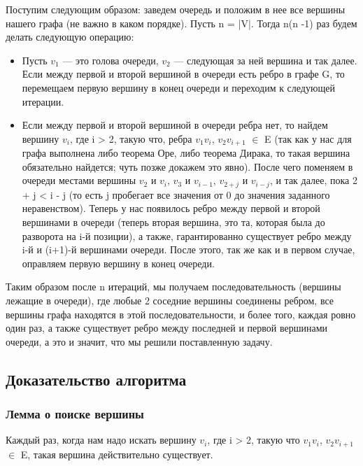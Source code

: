 Поступим следующим образом: заведем очередь и положим в нее все вершины нашего графа (не важно в каком порядке).
Пусть n = |V|. Тогда n(n -1) раз будем делать следующую операцию:
\begin{itemize}

    \item Пусть $v_1$ — это голова очереди, $v_2$ — следующая за ней вершина и так далее.
    Если между первой и второй вершиной в очереди есть ребро в графе G, то перемещаем первую вершину в конец очереди и переходим к следующей итерации.

    \item Если между первой и второй вершиной в очереди ребра нет, то найдем вершину $v_i$, где i > 2, такую что, ребра $v_1$$v_i$, $v_2$$v_{i+1}$ $\in$ E (так как у нас для графа выполнена либо теорема Оре, либо теорема Дирака, то такая вершина обязательно найдется; чуть позже докажем это явно).
    После чего поменяем в очереди местами вершины $v_2$ и $v_i$, $v_3$ и $v_{i-1}$, $v_{2+j}$ и $v_{i-j}$, и так далее, пока 2 + j < i - j (то есть j пробегает все значения от 0 до значения заданного неравенством).
    Теперь у нас появилось ребро между первой и второй вершинами в очереди (теперь вторая вершина, это та, которая была до разворота на i-й позиции), а также, гарантированно существует ребро между i-й и (i+1)-й вершинами очереди.
    После этого, так же как и в первом случае, оправляем первую вершину в конец очереди.

\end{itemize}

Таким образом после n итераций, мы получаем последовательность (вершины лежащие в очереди), где любые 2 соседние вершины соединены ребром, все вершины графа находятся в этой последовательности, и более того, каждая ровно один раз, а также существует ребро между последней и первой вершинами очереди, а это и значит, что мы решили поставленную задачу.

\subsection{Доказательство алгоритма}

\subsubsection{Лемма о поиске вершины}
Каждый раз, когда нам надо искать вершину $v_i$, где i > 2, такую что $v_1$$v_i$, $v_2$$v_{i+1}$ $\in$ E, такая вершина действительно существует.

